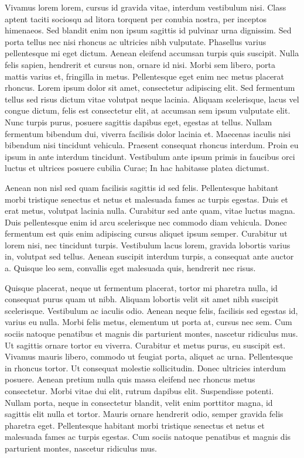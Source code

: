 Vivamus lorem lorem, cursus id gravida vitae, interdum vestibulum nisi.
Class aptent taciti sociosqu ad litora torquent per conubia nostra, per inceptos himenaeos.
Sed blandit enim non ipsum sagittis id pulvinar urna dignissim.
Sed porta tellus nec nisi rhoncus ac ultricies nibh vulputate.
Phasellus varius pellentesque mi eget dictum.
Aenean eleifend accumsan turpis quis suscipit.
Nulla felis sapien, hendrerit et cursus non, ornare id nisi.
Morbi sem libero, porta mattis varius et, fringilla in metus.
Pellentesque eget enim nec metus placerat rhoncus.
Lorem ipsum dolor sit amet, consectetur adipiscing elit.
Sed fermentum tellus sed risus dictum vitae volutpat neque lacinia.
Aliquam scelerisque, lacus vel congue dictum, felis est consectetur elit, at accumsan sem ipsum vulputate elit.
Nunc turpis purus, posuere sagittis dapibus eget, egestas at tellus.
Nullam fermentum bibendum dui, viverra facilisis dolor lacinia et.
Maecenas iaculis nisi bibendum nisi tincidunt vehicula.
Praesent consequat rhoncus interdum.
Proin eu ipsum in ante interdum tincidunt.
Vestibulum ante ipsum primis in faucibus orci luctus et ultrices posuere cubilia Curae; In hac habitasse platea dictumst.

Aenean non nisl sed quam facilisis sagittis id sed felis.
Pellentesque habitant morbi tristique senectus et netus et malesuada fames ac turpis egestas.
Duis et erat metus, volutpat lacinia nulla.
Curabitur sed ante quam, vitae luctus magna.
Duis pellentesque enim id arcu scelerisque nec commodo diam vehicula.
Donec fermentum est quis enim adipiscing cursus aliquet ipsum semper.
Curabitur ut lorem nisi, nec tincidunt turpis.
Vestibulum lacus lorem, gravida lobortis varius in, volutpat sed tellus.
Aenean suscipit interdum turpis, a consequat ante auctor a.
Quisque leo sem, convallis eget malesuada quis, hendrerit nec risus.

Quisque placerat, neque ut fermentum placerat, tortor mi pharetra nulla, id consequat purus quam ut nibh.
Aliquam lobortis velit sit amet nibh suscipit scelerisque.
Vestibulum ac iaculis odio.
Aenean neque felis, facilisis sed egestas id, varius eu nulla.
Morbi felis metus, elementum ut porta at, cursus nec sem.
Cum sociis natoque penatibus et magnis dis parturient montes, nascetur ridiculus mus.
Ut sagittis ornare tortor eu viverra.
Curabitur et metus purus, eu suscipit est.
Vivamus mauris libero, commodo ut feugiat porta, aliquet ac urna.
Pellentesque in rhoncus tortor.
Ut consequat molestie sollicitudin.
Donec ultricies interdum posuere.
Aenean pretium nulla quis massa eleifend nec rhoncus metus consectetur.
Morbi vitae dui elit, rutrum dapibus elit.
Suspendisse potenti.
Nullam porta, neque in consectetur blandit, velit enim porttitor magna, id sagittis elit nulla et tortor.
Mauris ornare hendrerit odio, semper gravida felis pharetra eget.
Pellentesque habitant morbi tristique senectus et netus et malesuada fames ac turpis egestas.
Cum sociis natoque penatibus et magnis dis parturient montes, nascetur ridiculus mus.

